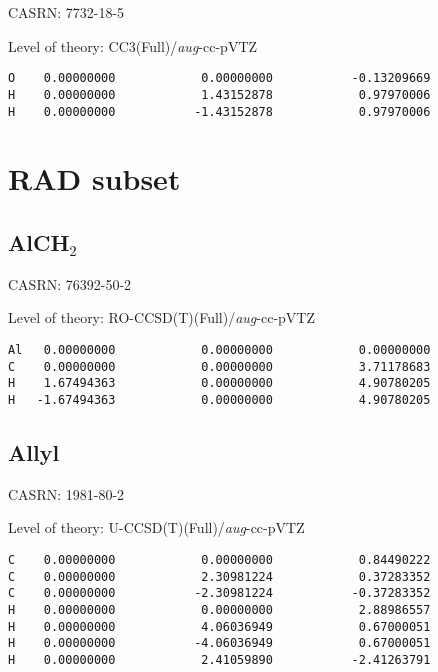 \documentclass[journal=jctcce,manuscript=article,layout=traditional]{achemso}
\newcommand{\AVTZ}{\emph{aug}-cc-pVTZ}
\begin{document}
CASRN: 7732-18-5

\begin{singlespace}
\noindent Level of theory: CC3(Full)/{\AVTZ}
\begin{verbatim}
O    0.00000000            0.00000000           -0.13209669
H    0.00000000            1.43152878            0.97970006
H    0.00000000           -1.43152878            0.97970006
\end{verbatim}
\end{singlespace}

\clearpage


\section{RAD subset}

\subsection{AlCH$_2$}

CASRN: 76392-50-2

\begin{singlespace}
\noindent Level of theory: RO-CCSD(T)(Full)/{\AVTZ}
\begin{verbatim}
Al   0.00000000            0.00000000            0.00000000  
C    0.00000000            0.00000000            3.71178683  
H    1.67494363            0.00000000            4.90780205  
H   -1.67494363            0.00000000            4.90780205  
\end{verbatim}
\end{singlespace}


\subsection{Allyl}

CASRN: 1981-80-2

\begin{singlespace}
\noindent Level of theory: U-CCSD(T)(Full)/{\AVTZ}
\begin{verbatim}
C    0.00000000            0.00000000            0.84490222  
C    0.00000000            2.30981224            0.37283352  
C    0.00000000           -2.30981224           -0.37283352  
H    0.00000000            0.00000000            2.88986557  
H    0.00000000            4.06036949            0.67000051  
H    0.00000000           -4.06036949            0.67000051  
H    0.00000000            2.41059890           -2.41263791  
\end{verbatim}
\end{singlespace}
\end{document}
